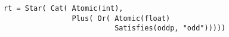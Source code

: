 \begin{lstlisting}[style=reclojurePython]
rt = Star( Cat( Atomic(int),
                Plus( Or( Atomic(float)
                          Satisfies(oddp, "odd")))))
\end{lstlisting}
